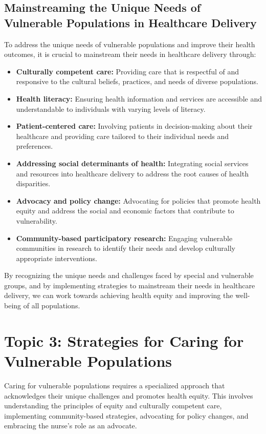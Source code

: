 \documentclass[12pt,a4paper]{article}
\begin{document}
\subsection*{Mainstreaming the Unique Needs of Vulnerable Populations in Healthcare Delivery}
To address the unique needs of vulnerable populations and improve their health outcomes, it is crucial to mainstream their needs in healthcare delivery through:
\begin{itemize}
    \item \textbf{Culturally competent care:} Providing care that is respectful of and responsive to the cultural beliefs, practices, and needs of diverse populations.
    \item \textbf{Health literacy:} Ensuring health information and services are accessible and understandable to individuals with varying levels of literacy.
    \item \textbf{Patient-centered care:} Involving patients in decision-making about their healthcare and providing care tailored to their individual needs and preferences.
    \item \textbf{Addressing social determinants of health:} Integrating social services and resources into healthcare delivery to address the root causes of health disparities.
    \item \textbf{Advocacy and policy change:} Advocating for policies that promote health equity and address the social and economic factors that contribute to vulnerability.
    \item \textbf{Community-based participatory research:} Engaging vulnerable communities in research to identify their needs and develop culturally appropriate interventions.
\end{itemize}

By recognizing the unique needs and challenges faced by special and vulnerable groups, and by implementing strategies to mainstream their needs in healthcare delivery, we can work towards achieving health equity and improving the well-being of all populations.

\section*{Topic 3: Strategies for Caring for Vulnerable Populations}

Caring for vulnerable populations requires a specialized approach that acknowledges their unique challenges and promotes health equity. This involves understanding the principles of equity and culturally competent care, implementing community-based strategies, advocating for policy changes, and embracing the nurse's role as an advocate.
\end{document}
